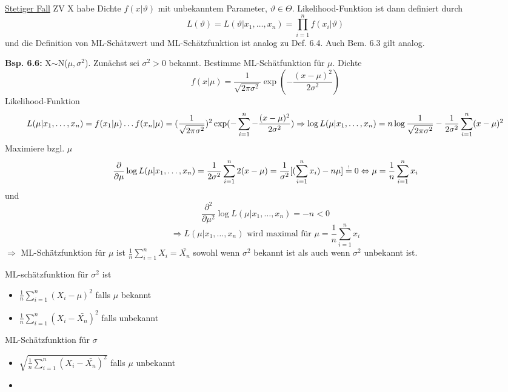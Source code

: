 \documentclass[a4paper,11pt]{article}
\begin{document}
\noindent\underline{Stetiger Fall}
\newline ZV X habe Dichte $f(x|\vartheta)$ mit unbekanntem Parameter, $\vartheta\in\Theta$. 
\newline Likelihood-Funktion ist dann definiert durch 
\[L(\vartheta)=L(\vartheta|x_1,\dots,x_n)=\prod_{i=1}^{n}f(x_i|\vartheta)\]
und die Definition von ML-Schätzwert und ML-Schätzfunktion ist analog zu Def. 6.4. Auch Bem. 6.3 gilt analog. 

\vspace{6pt}
\noindent\textbf{Bsp. 6.6:}
X$\sim$N($\mu,\sigma^2$). Zunächst sei $\sigma^2>0$ bekannt. 
\newline Bestimme ML-Schätfunktion für $\mu$.
\newline Dichte
\[f(x|\mu)=\frac{1}{\sqrt{2\pi\sigma^2}}\exp(-\frac{(x-\mu)^2}{2\sigma^2})\] 
Likelihood-Funktion
\begin{equation*}
L(\mu|x_1,\dots,x_n)=f(x_1|\mu)\dots f(x_n|\mu)=(\frac{1}{\sqrt{2\pi\sigma^2}})^2\exp(-\sum_{i=1}^{n}-\frac{(x-\mu)^2}{2\sigma^2})\\
\Rightarrow \log L(\mu|x_1,\dots,x_n)=n\log\frac{1}{\sqrt{2\pi\sigma^2}}-\frac{1}{2\sigma^2}\sum_{i=1}^{n}(x-\mu)^2\\
\end{equation*}
Maximiere bzgl. $\mu$
\begin{equation*}
\frac{\partial}{\partial\mu}\log L(\mu|x_1,\dots,x_n)=\frac{1}{2\sigma^2}\sum_{i=1}^{n}2(x-\mu)=\frac{1}{\sigma^2}[(\sum_{i=1}^{n}x_i)-n\mu] \overset{\mathclap{\scriptscriptstyle !}}{=}0\\
\Leftrightarrow \mu=\frac{1}{n}\sum_{i=1}^{n}x_i\\
\end{equation*}
und 
\[\frac{\partial^2}{\partial\mu^2}\log L(\mu|x_1,\dots,x_n)=-n<0\]
\[\Rightarrow L(\mu|x_1,\dots,x_n) \text{ wird maximal für }\mu=\frac{1}{n}\sum_{i=1}^{n}x_i\]
$\Rightarrow$ ML-Schätzfunktion für $\mu$ ist $\frac{1}{n}\sum_{i=1}^{n}X_i=\bar{X_n}$ sowohl wenn $\sigma^2$ bekannt ist als auch wenn $\sigma^2$ unbekannt ist. 

\noindent ML-schätzfunktion für $\sigma^2$ ist 
\begin{itemize}
\item[] $\frac{1}{n}\sum_{i=1}^{n}(X_i-\mu)^2$ falls $\mu$ bekannt
\item[] $\frac{1}{n}\sum_{i=1}^{n}(X_i-\bar{X_n})^2$ falls unbekannt
\end{itemize}

ML-Schätzfunktion für $\sigma$
\begin{itemize}
\item[] $\sqrt{\frac{1}{n}\sum_{i=1}^{n}(X_i-\bar{X_n})^2}$ falls $\mu$ unbekannt
\item[] 
\end{itemize}
\end{document}
